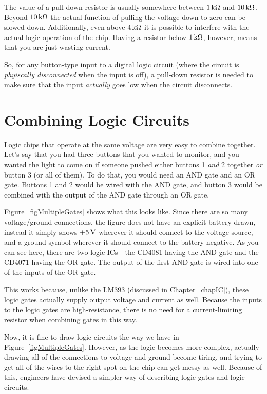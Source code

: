 The value of a pull-down resistor is usually somewhere between $1\,\si{\kilo\ohm}$ and $10\,\si{\kilo\ohm}$.  
Beyond $10\,\si{\kilo\ohm}$ the actual function of pulling the voltage down to zero can be slowed down.  
Additionally, even above $4\,\si{\kilo\ohm}$ it is possible to interfere with the actual logic operation of the chip.
Having a resistor below $1\,\si{\kilo\ohm}$, however, means that you are just wasting current.

So, for any button-type input to a digital logic circuit (where the circuit is \emph{phyiscally disconnected} when the input is off), a pull-down resistor is needed to make sure that the input \emph{actually} goes low when the circuit disconnects.

\section{Combining Logic Circuits}

Logic chips that operate at the same voltage are very easy to combine together.
Let's say that you had three buttons that you wanted to monitor, and you wanted the light to come on if someone pushed either buttons 1 \emph{and} 2 together \emph{or} button 3 (or all of them).
To do that, you would need an AND gate and an OR gate.
Buttons 1 and 2 would be wired with the AND gate, and button 3 would be combined with the output of the AND gate through an OR gate.


Figure~\ref{figMultipleGates} shows what this looks like.
Since there are so many voltage/ground connections, the figure does not have an explicit battery drawn, instead it simply shows $+5\,\si{\volt}$ wherever it should connect to the voltage source, and a ground symbol wherever it should connect to the battery negative.
As you can see here, there are two logic ICs---the CD4081 having the AND gate and the CD4071 having the OR gate.
The output of the first AND gate is wired into one of the inputs of the OR gate.

This works because, unlike the LM393 (discussed in Chapter~\ref{chapIC}), these logic gates actually supply output voltage and current as well.  
Because the inputs to the logic gates are high-resistance, there is no need for a current-limiting resistor when combining gates in this way.

Now, it is fine to draw logic circuits the way we have in Figure~\ref{figMultipleGates}.
However, as the logic becomes more complex, actually drawing all of the connections to voltage and ground become tiring, and trying to get all of the wires to the right spot on the chip can get messy as well.
Because of this, engineers have devised a simpler way of describing logic gates and logic circuits.

